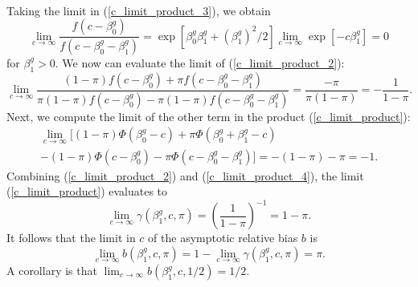 \documentclass[12pt]{article}
\begin{document}
\begin{appendices}
\begin{refsection}
\begin{multline}
		\end{multline}
		Taking the limit in (\ref{c_limit_product_3}), we obtain
		$$
		\lim_{c \to \infty} \frac{f(c - \beta^g_0)}{f(c - \beta^g_0 - \beta^g_1)} = \exp[ \beta^g_0 \beta^g_1 + (\beta^g_1)^2/2] \lim_{c \to \infty} \exp[ -c \beta^g_1] = 0
		$$ for $\beta^g_1 > 0$. We now can evaluate the limit of (\ref{c_limit_product_2}):
		$$ \lim_{c \to \infty} \frac{(1-\pi) f(c - \beta^g_0) + \pi f(c - \beta^g_0 - \beta^g_1)}{\pi (1-\pi) f(c - \beta^g_0) - \pi (1-\pi)f(c - \beta^g_0 - \beta^g_1)} = \frac{-\pi}{\pi(1-\pi)} = -\frac{1}{1 -\pi}.$$ Next, we compute the limit of the other term in the product (\ref{c_limit_product}):
		\begin{multline}\label{c_limit_product_4}
		\lim_{c \to \infty} \bigg[ (1-\pi)\Phi(\beta_0^g - c) + \pi \Phi(\beta^g_0 + \beta^g_1 - c) \\ - (1-\pi)\Phi(c - \beta^g_0) - \pi \Phi(c - \beta_0^g - \beta_1^g) \bigg] = -(1-\pi) - \pi = -1.
		\end{multline}
		Combining (\ref{c_limit_product_2}) and (\ref{c_limit_product_4}), the limit (\ref{c_limit_product}) evaluates to
		$$ \lim_{c \to \infty} \gamma(\beta^g_1, c, \pi) = \left(  \frac{ 1 }{ 1 - \pi }\right)^{-1} = 1 - \pi.$$ It follows that the limit in $c$ of the asymptotic relative bias $b$ is
		$$\lim_{c \to \infty} b(\beta^g_1, c, \pi) = 1 - \lim_{c \to \infty} \gamma(\beta^g_1, c, \pi) = \pi.$$
		A corollary is that
		$\lim_{c \to \infty} b(\beta^g_1, c, 1/2) = 1/2.$
		

\end{refsection}
\end{appendices}
\end{document}
